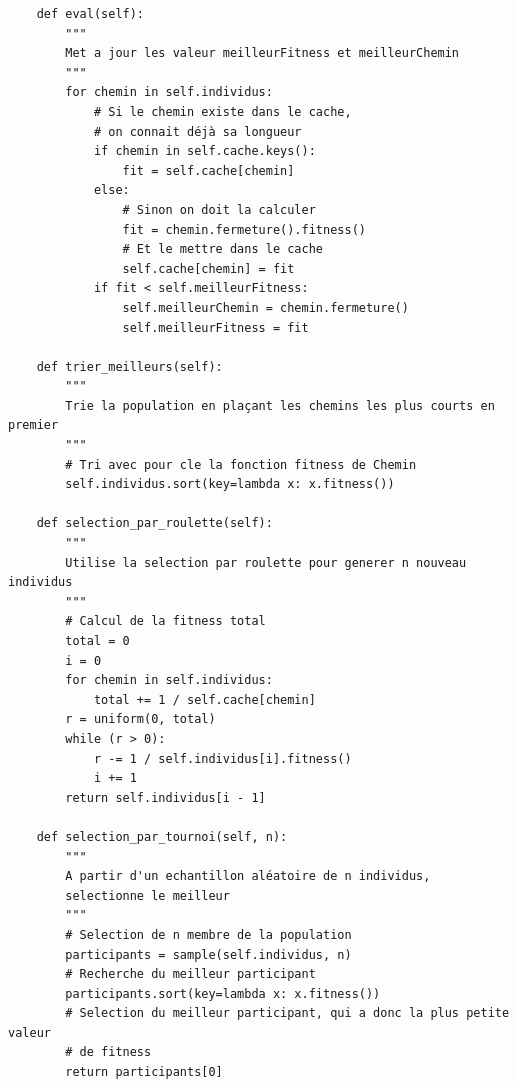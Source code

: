 \documentclass[12pt]{article}
\begin{document}
\begin{verbatim}
    def eval(self):
        """
        Met a jour les valeur meilleurFitness et meilleurChemin
        """
        for chemin in self.individus:
            # Si le chemin existe dans le cache,
            # on connait déjà sa longueur
            if chemin in self.cache.keys():
                fit = self.cache[chemin]
            else:
                # Sinon on doit la calculer
                fit = chemin.fermeture().fitness()
                # Et le mettre dans le cache
                self.cache[chemin] = fit
            if fit < self.meilleurFitness:
                self.meilleurChemin = chemin.fermeture()
                self.meilleurFitness = fit

    def trier_meilleurs(self):
        """
        Trie la population en plaçant les chemins les plus courts en premier
        """
        # Tri avec pour cle la fonction fitness de Chemin
        self.individus.sort(key=lambda x: x.fitness())

    def selection_par_roulette(self):
        """
        Utilise la selection par roulette pour generer n nouveau individus
        """
        # Calcul de la fitness total
        total = 0
        i = 0
        for chemin in self.individus:
            total += 1 / self.cache[chemin]
        r = uniform(0, total)
        while (r > 0):
            r -= 1 / self.individus[i].fitness()
            i += 1
        return self.individus[i - 1]

    def selection_par_tournoi(self, n):
        """
        A partir d'un echantillon aléatoire de n individus,
        selectionne le meilleur
        """
        # Selection de n membre de la population
        participants = sample(self.individus, n)
        # Recherche du meilleur participant
        participants.sort(key=lambda x: x.fitness())
        # Selection du meilleur participant, qui a donc la plus petite valeur
        # de fitness
        return participants[0]


\end{verbatim}
\end{document}
